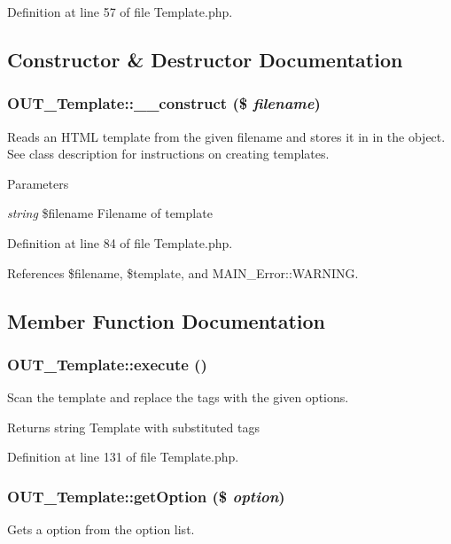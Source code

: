 Definition at line 57 of file Template.php.

\subsection{Constructor \& Destructor Documentation}
\hypertarget{classOUT__Template_ad750e5ccf638adee8a6bcb8794c1eb3f}{
\subsubsection[{\_\-\_\-construct}]{\setlength{\rightskip}{0pt plus 5cm}OUT\_\-Template::\_\-\_\-construct (\$ {\em filename})}}
\label{d0/dcf/classOUT__Template_ad750e5ccf638adee8a6bcb8794c1eb3f}
Reads an HTML template from the given filename and stores it in in the object. See class description for instructions on creating templates.


\begin{DoxyParams}{Parameters}
\item[{\em string}]\$filename Filename of template \end{DoxyParams}


Definition at line 84 of file Template.php.

References \$filename, \$template, and MAIN\_\-Error::WARNING.

\subsection{Member Function Documentation}
\hypertarget{classOUT__Template_a87d9c155f0467841a0ce3a61c6131f5e}{
\subsubsection[{execute}]{\setlength{\rightskip}{0pt plus 5cm}OUT\_\-Template::execute ()}}
\label{d0/dcf/classOUT__Template_a87d9c155f0467841a0ce3a61c6131f5e}
Scan the template and replace the tags with the given options.

\begin{DoxyReturn}{Returns}
string Template with substituted tags 
\end{DoxyReturn}


Definition at line 131 of file Template.php.\hypertarget{classOUT__Template_a2f0cd6dd6fe55fbc4926cfa10bf48abb}{
\subsubsection[{getOption}]{\setlength{\rightskip}{0pt plus 5cm}OUT\_\-Template::getOption (\$ {\em option})}}
\label{d0/dcf/classOUT__Template_a2f0cd6dd6fe55fbc4926cfa10bf48abb}
Gets a option from the option list.


